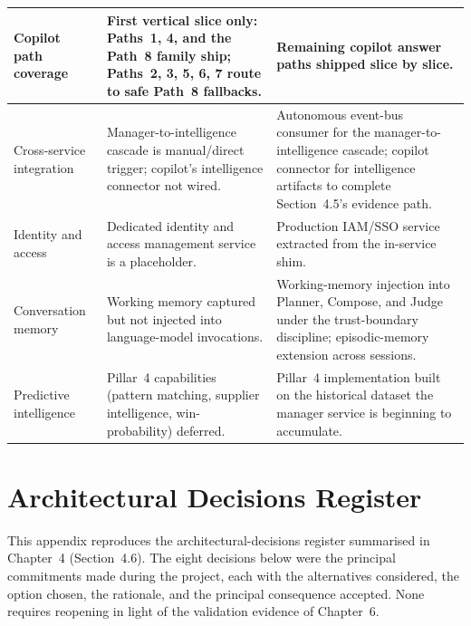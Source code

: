 \begin{xltabular}{\textwidth}{|p{2.5cm}|>{\RaggedRight\arraybackslash}X|>{\RaggedRight\arraybackslash}X|}
Copilot path coverage & First vertical slice only: Paths~1, 4, and the Path~8 family ship; Paths~2, 3, 5, 6, 7 route to safe Path~8 fallbacks. & Remaining copilot answer paths shipped slice by slice. \\ \hline
Cross-service integration & Manager-to-intelligence cascade is manual/direct trigger; copilot's intelligence connector not wired. & Autonomous event-bus consumer for the manager-to-intelligence cascade; copilot connector for intelligence artifacts to complete Section~4.5's evidence path. \\ \hline
Identity and access & Dedicated identity and access management service is a placeholder. & Production IAM/SSO service extracted from the in-service shim. \\ \hline
Conversation memory & Working memory captured but not injected into language-model invocations. & Working-memory injection into Planner, Compose, and Judge under the trust-boundary discipline; episodic-memory extension across sessions. \\ \hline
Predictive intelligence & Pillar~4 capabilities (pattern matching, supplier intelligence, win-probability) deferred. & Pillar~4 implementation built on the historical dataset the manager service is beginning to accumulate. \\ \hline
\end{xltabular}
\endgroup

\section{Architectural Decisions Register}
\label{app:adr}

This appendix reproduces the architectural-decisions register summarised in Chapter~4 (Section~4.6). The eight decisions below were the principal commitments made during the project, each with the alternatives considered, the option chosen, the rationale, and the principal consequence accepted. None requires reopening in light of the validation evidence of Chapter~6.

